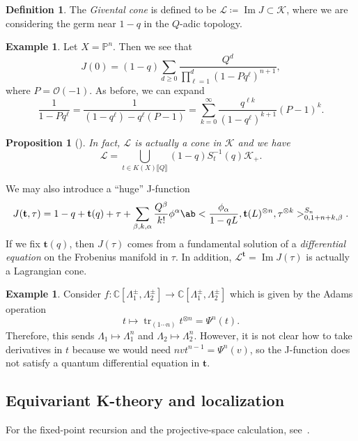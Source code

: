 \documentclass{amsart}
\newtheorem{prop}[thm]{Proposition}
\theoremstyle{definition}
\newtheorem{defn}[thm]{Definition}
\newtheorem{exm}[thm]{Example}
\theoremstyle{remark}
\theoremstyle{plain}
\theoremstyle{definition}
\theoremstyle{remark}
\DeclareMathOperator{\Ima}{Im}
\newcommand{\C}{\mathbb{C}}
\renewcommand{\P}{\mathbb{P}}
\newcommand{\mc}[1]{\mathcal{#1}}
\newcommand{\on}[1]{\operatorname{#1}}
\newcommand{\1}{\mathbf{1}}
\newcommand{\2}{\mathbf{2}}
\newcommand{\3}{\mathbf{3}}
\newcommand{\ps}[1]{\llbracket #1 \rrbracket}
\begin{document}
\begin{defn}
    The \textit{Givental cone} is defined to be \(\mc{L} \coloneqq \Ima J \subset \mc{K}\), where we are considering the germ near \(1-q\) in the \(Q\)-adic topology.
\end{defn}

\begin{exm}
    Let \(X = \P^n\). Then we see that
    \[ J(0) = (1-q) \sum_{d \geq 0} \frac{Q^d}{\prod_{\ell=1}^d (1-Pq^{\ell})^{n+1}}, \]
    where \(P = \mc{O}(-1)\). As before, we can expand
    \[ \frac{1}{1-P q^{\ell}} = \frac{1}{(1-q^{\ell}) - q^{\ell}(P-1)} = \sum_{k=0}^{\infty} \frac{q^{\ell k}}{(1-q^{\ell})^{k+1}}(P-1)^k. \]
\end{exm}

\begin{prop}[{\cite{GiventalK7}}]
    In fact, \(\mc{L}\) is actually a cone in \(\mc{K}\) and we have
    \[ \mc{L} = \bigcup_{t \in K(X)\ps{Q}} (1-q) S_{t}^{-1}(q) \mc{K}_+. \]
\end{prop}

We may also introduce a ``huge'' J-function
\[ J(\mathbf{t}, \tau) = 1-q + \mathbf{t}(q) + \tau + \sum_{\beta, k, \alpha} \frac{Q^{\beta}}{k!} \phi^{\alpha} \ab< \frac{\phi_{\alpha}}{1-qL}, \mathbf{t}(L)^{\otimes n}, \tau^{\otimes k}>_{0,1+n+k,\beta}^{S_n}. \]
If we fix \(\mathbf{t}(q)\), then \(J(\tau)\) comes from a fundamental solution of a \textit{differential equation} on the Frobenius manifold in \(\tau\). In addition, \(\mc{L}^{\mathbf{t}}=  \Ima J(\tau)\) is actually a Lagrangian cone.

\begin{exm}
    Consider \(f \colon \C[\Lambda_1^{\pm}, \Lambda_2^{\pm}] \to \C[\Lambda_1^{\pm}, \Lambda_2^{\pm}]\) which is given by the Adams operation
    \[ t \mapsto \on{tr}_{(1\cdots n)} t^{\otimes n} = \Psi^n (t). \]
    Therefore, this sends \(\Lambda_1 \mapsto \Lambda_1^n\) and \(\Lambda_2 \mapsto \Lambda_2^n\). However, it is not clear how to take derivatives in \(t\) because we would need \(nv t^{n-1} = \Psi^n(v)\), so the J-function does not satisfy a quantum differential equation in \(\mathbf{t}\).
\end{exm}

\subsection{Equivariant K-theory and localization}%
\label{sub:Equivariant K-theory and localization}

For the fixed-point recursion and the projective-space calculation, see~\cite{GiventalK2}.
\end{document}
